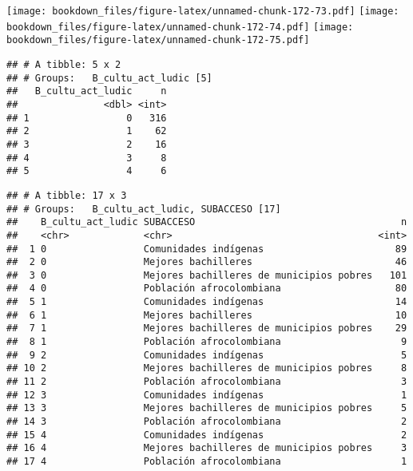 \documentclass[]{article}
\theoremstyle{definition}
\theoremstyle{definition}
\theoremstyle{definition}
\theoremstyle{remark}
\begin{document}
\texttt{[image: bookdown\_files/figure-latex/unnamed-chunk-172-73.pdf]}
\texttt{[image: bookdown\_files/figure-latex/unnamed-chunk-172-74.pdf]}
\texttt{[image: bookdown\_files/figure-latex/unnamed-chunk-172-75.pdf]}

\begin{verbatim}
## # A tibble: 5 x 2
## # Groups:   B_cultu_act_ludic [5]
##   B_cultu_act_ludic     n
##               <dbl> <int>
## 1                 0   316
## 2                 1    62
## 3                 2    16
## 4                 3     8
## 5                 4     6
\end{verbatim}

\begin{verbatim}
## # A tibble: 17 x 3
## # Groups:   B_cultu_act_ludic, SUBACCESO [17]
##    B_cultu_act_ludic SUBACCESO                                    n
##    <chr>             <chr>                                    <int>
##  1 0                 Comunidades indígenas                       89
##  2 0                 Mejores bachilleres                         46
##  3 0                 Mejores bachilleres de municipios pobres   101
##  4 0                 Población afrocolombiana                    80
##  5 1                 Comunidades indígenas                       14
##  6 1                 Mejores bachilleres                         10
##  7 1                 Mejores bachilleres de municipios pobres    29
##  8 1                 Población afrocolombiana                     9
##  9 2                 Comunidades indígenas                        5
## 10 2                 Mejores bachilleres de municipios pobres     8
## 11 2                 Población afrocolombiana                     3
## 12 3                 Comunidades indígenas                        1
## 13 3                 Mejores bachilleres de municipios pobres     5
## 14 3                 Población afrocolombiana                     2
## 15 4                 Comunidades indígenas                        2
## 16 4                 Mejores bachilleres de municipios pobres     3
## 17 4                 Población afrocolombiana                     1
\end{verbatim}
\end{document}
